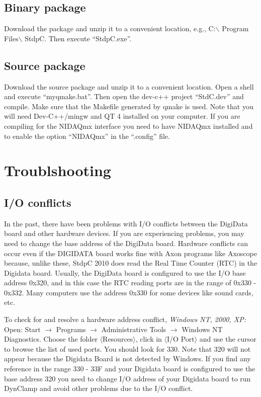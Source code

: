 \documentclass{article}
\begin{document}
\subsection{Binary package}
Download the package and unzip it to a convenient location, e.g.,
C:$\backslash$ Program Files$\backslash$ StdpC. Then execute ``StdpC.exe''.

\subsection{Source package}
Download the source package and unzip it to a convenient
location. Open a shell and execute ``myqmake.bat''. Then open the
dev-c++ project ``StdC.dev'' and compile. Make sure that the Makefile
generated by qmake is used. Note that you will need Dev-C++/mingw and
QT 4 installed on your computer. If you are compiling for the NIDAQmx
interface you need to have NIDAQmx installed and to enable the option ``NIDAQmx'' in the ``.config'' file.

\section{Troublshooting}
\subsection{I/O conflicts}
 
In the past, there have been problems with I/O conflicts between the
DigiData board and other hardware devices. If you are experiencing
problems, you may need to change the base address of the DigiData
board. Hardware conflicts can occur even if the DIGIDATA board works
fine with Axon programs like Axoscope because, unlike these, StdpC
2010 does read the Real Time Counter (RTC) in the Digidata
board. Usually, the DigiData board is configured to use the I/O base
address 0x320, and in this case the RTC reading ports are in the range
of 0x330 - 0x332. Many computers use the address 0x330 for some devices like
sound cards, etc.

To check for and resolve a hardware address conflict,
\noindent
{\em Windows NT, 2000, XP: } \\
Open: Start $\rightarrow$ Programs $\rightarrow$ Administrative Tools
$\rightarrow$ Windows NT Diagnostics. Choose the folder
$\langle$Resources$\rangle$, click in $\langle$I/O Port$\rangle$ and use the
cursor to browse the list of used ports.  You should look for 330. Note that
320 will not appear because the Digidata Board is not detected by Windows. If
you find any reference in the range 330 - 33F and your Digidata board is
configured to use the base address 320 you need to change I/O address of your
Digidata board to run DynClamp and avoid other problems due to the I/O
conflict.
\end{document}
